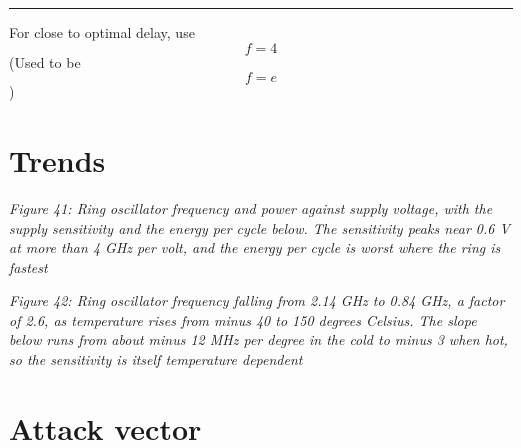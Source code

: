 \begin{center}\rule{0.5\linewidth}{0.5pt}\end{center}

For close to optimal delay, use \[f = 4\] \emph{}(Used to be
\[f=e\])\emph{}

\section{Trends}\label{trends}


{
\centering
{}
}

\emph{Figure 41: Ring oscillator frequency and power against supply
voltage, with the supply sensitivity and the energy per cycle below. The
sensitivity peaks near 0.6 V at more than 4 GHz per volt, and the energy
per cycle is worst where the ring is fastest}


{
\centering
{}
}

\emph{Figure 42: Ring oscillator frequency falling from 2.14 GHz to 0.84
GHz, a factor of 2.6, as temperature rises from minus 40 to 150 degrees
Celsius. The slope below runs from about minus 12 MHz per degree in the
cold to minus 3 when hot, so the sensitivity is itself temperature
dependent}

\section{Attack vector}\label{attack-vector}

